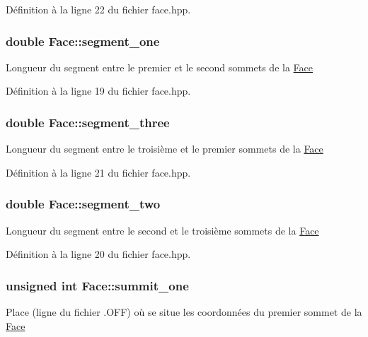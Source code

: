 Définition à la ligne 22 du fichier face.\-hpp.

\hypertarget{class_face_ae4053947c53549d2fd5cf43aa9c712f4}{
\subsubsection[{segment\-\_\-one}]{\setlength{\rightskip}{0pt plus 5cm}double Face\-::segment\-\_\-one\hspace{0.3cm}{\ttfamily [private]}}}\label{class_face_ae4053947c53549d2fd5cf43aa9c712f4}
Longueur du segment entre le premier et le second sommets de la \hyperlink{class_face}{Face} 

Définition à la ligne 19 du fichier face.\-hpp.

\hypertarget{class_face_a777ca579978d8d20c6e8a5e64a6999cc}{
\subsubsection[{segment\-\_\-three}]{\setlength{\rightskip}{0pt plus 5cm}double Face\-::segment\-\_\-three\hspace{0.3cm}{\ttfamily [private]}}}\label{class_face_a777ca579978d8d20c6e8a5e64a6999cc}
Longueur du segment entre le troisième et le premier sommets de la \hyperlink{class_face}{Face} 

Définition à la ligne 21 du fichier face.\-hpp.

\hypertarget{class_face_ae79107e53090d0a7efb5070ea093a70e}{
\subsubsection[{segment\-\_\-two}]{\setlength{\rightskip}{0pt plus 5cm}double Face\-::segment\-\_\-two\hspace{0.3cm}{\ttfamily [private]}}}\label{class_face_ae79107e53090d0a7efb5070ea093a70e}
Longueur du segment entre le second et le troisième sommets de la \hyperlink{class_face}{Face} 

Définition à la ligne 20 du fichier face.\-hpp.

\hypertarget{class_face_a68ff25f391cfe3ee5ce2b7f13dac64fa}{
\subsubsection[{summit\-\_\-one}]{\setlength{\rightskip}{0pt plus 5cm}unsigned int Face\-::summit\-\_\-one\hspace{0.3cm}{\ttfamily [private]}}}\label{class_face_a68ff25f391cfe3ee5ce2b7f13dac64fa}
Place (ligne du fichier .O\-F\-F) où se situe les coordonnées du premier sommet de la \hyperlink{class_face}{Face} 

